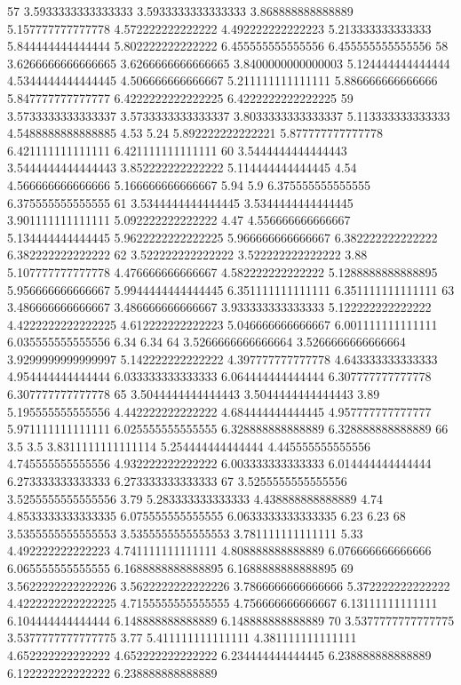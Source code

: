 57 3.5933333333333333 3.5933333333333333 3.868888888888889 5.157777777777778 4.572222222222222 4.492222222222223 5.213333333333333 5.844444444444444 5.802222222222222 6.455555555555556 6.455555555555556
58 3.6266666666666665 3.6266666666666665 3.8400000000000003 5.124444444444444 4.5344444444444445 4.506666666666667 5.211111111111111 5.886666666666666 5.847777777777777 6.4222222222222225 6.4222222222222225
59 3.5733333333333337 3.5733333333333337 3.8033333333333337 5.113333333333333 4.5488888888888885 4.53 5.24 5.892222222222221 5.877777777777778 6.421111111111111 6.421111111111111
60 3.5444444444444443 3.5444444444444443 3.852222222222222 5.114444444444445 4.54 4.566666666666666 5.166666666666667 5.94 5.9 6.375555555555555 6.375555555555555
61 3.5344444444444445 3.5344444444444445 3.901111111111111 5.092222222222222 4.47 4.556666666666667 5.134444444444445 5.9622222222222225 5.966666666666667 6.382222222222222 6.382222222222222
62 3.522222222222222 3.522222222222222 3.88 5.107777777777778 4.476666666666667 4.582222222222222 5.1288888888888895 5.956666666666667 5.9944444444444445 6.351111111111111 6.351111111111111
63 3.486666666666667 3.486666666666667 3.933333333333333 5.122222222222222 4.4222222222222225 4.612222222222223 5.046666666666667 6.001111111111111 6.035555555555556 6.34 6.34
64 3.5266666666666664 3.5266666666666664 3.9299999999999997 5.142222222222222 4.397777777777778 4.643333333333333 4.954444444444444 6.033333333333333 6.064444444444444 6.307777777777778 6.307777777777778
65 3.5044444444444443 3.5044444444444443 3.89 5.195555555555556 4.442222222222222 4.684444444444445 4.957777777777777 5.971111111111111 6.025555555555555 6.328888888888889 6.328888888888889
66 3.5 3.5 3.8311111111111114 5.254444444444444 4.445555555555556 4.745555555555556 4.932222222222222 6.003333333333333 6.014444444444444 6.273333333333333 6.273333333333333
67 3.5255555555555556 3.5255555555555556 3.79 5.283333333333333 4.438888888888889 4.74 4.8533333333333335 6.075555555555555 6.0633333333333335 6.23 6.23
68 3.5355555555555553 3.5355555555555553 3.781111111111111 5.33 4.492222222222223 4.741111111111111 4.808888888888889 6.076666666666666 6.065555555555555 6.1688888888888895 6.1688888888888895
69 3.5622222222222226 3.5622222222222226 3.7866666666666666 5.372222222222222 4.4222222222222225 4.7155555555555555 4.756666666666667 6.13111111111111 6.104444444444444 6.148888888888889 6.148888888888889
70 3.5377777777777775 3.5377777777777775 3.77 5.411111111111111 4.381111111111111 4.652222222222222 4.652222222222222 6.234444444444445 6.238888888888889 6.122222222222222 6.238888888888889
